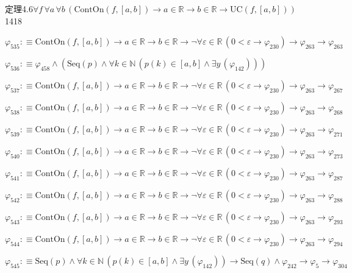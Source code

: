 \begin{fullproof}{定理4.6}{$\forall f\,\forall a\,\forall b\,(\mathrm{ContOn}(f,[a,b]) \to a \in \mathbb{R} \to b \in \mathbb{R} \to \mathrm{UC}(f,[a,b]))$}{1418}
\begin{abbrevlist}
\item $\varphi_{535} :\equiv \mathrm{ContOn}(f,[a,b]) \to a \in \mathbb{R} \to b \in \mathbb{R} \to \neg \forall \varepsilon \in \mathbb{R}\,(0 < \varepsilon \to \varphi_{230}) \to \varphi_{263} \to \varphi_{263}$
\item $\varphi_{536} :\equiv \varphi_{458} \land (\mathrm{Seq}(p) \land \forall k \in \mathbb{N}\,(p(k) \in [a,b] \land \exists y\,(\varphi_{142})))$
\item $\varphi_{537} :\equiv \mathrm{ContOn}(f,[a,b]) \to a \in \mathbb{R} \to b \in \mathbb{R} \to \neg \forall \varepsilon \in \mathbb{R}\,(0 < \varepsilon \to \varphi_{230}) \to \varphi_{263} \to \varphi_{267}$
\item $\varphi_{538} :\equiv \mathrm{ContOn}(f,[a,b]) \to a \in \mathbb{R} \to b \in \mathbb{R} \to \neg \forall \varepsilon \in \mathbb{R}\,(0 < \varepsilon \to \varphi_{230}) \to \varphi_{263} \to \varphi_{268}$
\item $\varphi_{539} :\equiv \mathrm{ContOn}(f,[a,b]) \to a \in \mathbb{R} \to b \in \mathbb{R} \to \neg \forall \varepsilon \in \mathbb{R}\,(0 < \varepsilon \to \varphi_{230}) \to \varphi_{263} \to \varphi_{271}$
\item $\varphi_{540} :\equiv \mathrm{ContOn}(f,[a,b]) \to a \in \mathbb{R} \to b \in \mathbb{R} \to \neg \forall \varepsilon \in \mathbb{R}\,(0 < \varepsilon \to \varphi_{230}) \to \varphi_{263} \to \varphi_{273}$
\item $\varphi_{541} :\equiv \mathrm{ContOn}(f,[a,b]) \to a \in \mathbb{R} \to b \in \mathbb{R} \to \neg \forall \varepsilon \in \mathbb{R}\,(0 < \varepsilon \to \varphi_{230}) \to \varphi_{263} \to \varphi_{287}$
\item $\varphi_{542} :\equiv \mathrm{ContOn}(f,[a,b]) \to a \in \mathbb{R} \to b \in \mathbb{R} \to \neg \forall \varepsilon \in \mathbb{R}\,(0 < \varepsilon \to \varphi_{230}) \to \varphi_{263} \to \varphi_{288}$
\item $\varphi_{543} :\equiv \mathrm{ContOn}(f,[a,b]) \to a \in \mathbb{R} \to b \in \mathbb{R} \to \neg \forall \varepsilon \in \mathbb{R}\,(0 < \varepsilon \to \varphi_{230}) \to \varphi_{263} \to \varphi_{293}$
\item $\varphi_{544} :\equiv \mathrm{ContOn}(f,[a,b]) \to a \in \mathbb{R} \to b \in \mathbb{R} \to \neg \forall \varepsilon \in \mathbb{R}\,(0 < \varepsilon \to \varphi_{230}) \to \varphi_{263} \to \varphi_{294}$
\item $\varphi_{545} :\equiv \mathrm{Seq}(p) \land \forall k \in \mathbb{N}\,(p(k) \in [a,b] \land \exists y\,(\varphi_{142})) \to \mathrm{Seq}(q) \land \varphi_{242} \to \varphi_{5} \to \varphi_{304}$

\end{abbrevlist}
\end{fullproof}

